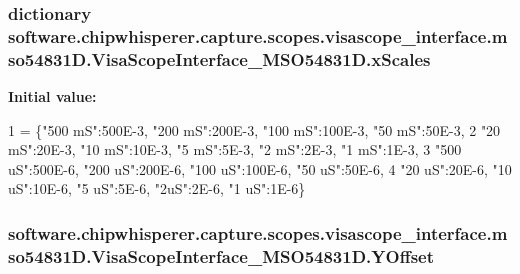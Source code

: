 \subsubsection[{x\+Scales}]{\setlength{\rightskip}{0pt plus 5cm}dictionary software.\+chipwhisperer.\+capture.\+scopes.\+visascope\+\_\+interface.\+mso54831\+D.\+Visa\+Scope\+Interface\+\_\+\+M\+S\+O54831\+D.\+x\+Scales\hspace{0.3cm}{\ttfamily [static]}}\label{classsoftware_1_1chipwhisperer_1_1capture_1_1scopes_1_1visascope__interface_1_1mso54831D_1_1VisaScopeInterface__MSO54831D_ab4c3e1e90a0046e62019fb53eac84d02}
{\bfseries Initial value\+:}
\begin{DoxyCode}
1 = \{\textcolor{stringliteral}{"500 mS"}:500E-3, \textcolor{stringliteral}{"200 mS"}:200E-3, \textcolor{stringliteral}{"100 mS"}:100E-3, \textcolor{stringliteral}{"50 mS"}:50E-3,
2                \textcolor{stringliteral}{"20 mS"}:20E-3, \textcolor{stringliteral}{"10 mS"}:10E-3, \textcolor{stringliteral}{"5 mS"}:5E-3, \textcolor{stringliteral}{"2 mS"}:2E-3, \textcolor{stringliteral}{"1 mS"}:1E-3,
3                \textcolor{stringliteral}{"500 uS"}:500E-6, \textcolor{stringliteral}{"200 uS"}:200E-6, \textcolor{stringliteral}{"100 uS"}:100E-6, \textcolor{stringliteral}{"50 uS"}:50E-6,
4                \textcolor{stringliteral}{"20 uS"}:20E-6, \textcolor{stringliteral}{"10 uS"}:10E-6, \textcolor{stringliteral}{"5 uS"}:5E-6, \textcolor{stringliteral}{"2uS"}:2E-6, \textcolor{stringliteral}{"1 uS"}:1E-6\}
\end{DoxyCode}
\hypertarget{classsoftware_1_1chipwhisperer_1_1capture_1_1scopes_1_1visascope__interface_1_1mso54831D_1_1VisaScopeInterface__MSO54831D_a24746b067ca033736d1700da81efb91e}{}
\subsubsection[{Y\+Offset}]{\setlength{\rightskip}{0pt plus 5cm}software.\+chipwhisperer.\+capture.\+scopes.\+visascope\+\_\+interface.\+mso54831\+D.\+Visa\+Scope\+Interface\+\_\+\+M\+S\+O54831\+D.\+Y\+Offset}\label{classsoftware_1_1chipwhisperer_1_1capture_1_1scopes_1_1visascope__interface_1_1mso54831D_1_1VisaScopeInterface__MSO54831D_a24746b067ca033736d1700da81efb91e}


